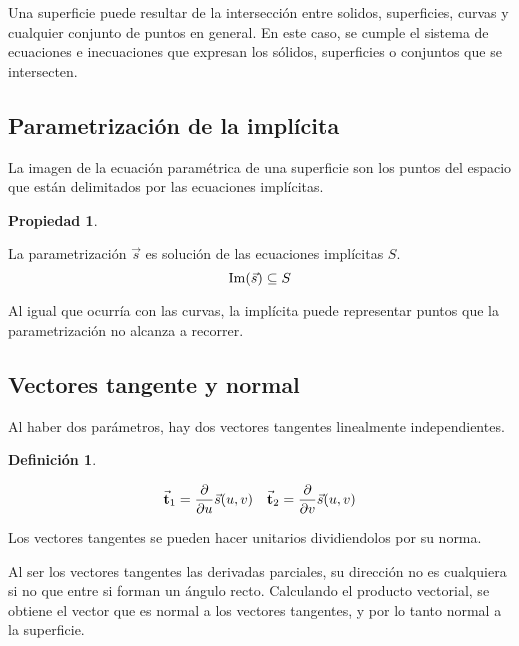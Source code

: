 \documentclass[a5paper,12pt,twoside]{book}
\newtheorem{defn}{{Definición}}[chapter]
\newtheorem{prop}{{Propiedad}}[chapter]
\begin{document}

Una superficie puede resultar de la intersección entre solidos, superficies, curvas y cualquier conjunto de puntos en general. En este caso, se cumple el sistema de ecuaciones e inecuaciones que expresan los sólidos, superficies o conjuntos que se intersecten.


\subsection{Parametrización de la implícita}

La imagen de la ecuación paramétrica de una superficie son los puntos del espacio que están delimitados por las ecuaciones implícitas.

\begin{mdframed}[style=MyFrame1]
    \begin{prop}
    \end{prop}
    La parametrización $\Vec{s}$ es solución de las ecuaciones implícitas $S$.
    \begin{equation*}
        \operatorname{Im} (\Vec{s}) \subseteq S
    \end{equation*}
\end{mdframed}

Al igual que ocurría con las curvas, la implícita puede representar puntos que la parametrización no alcanza a recorrer.


\subsection{Vectores tangente y normal}

Al haber dos parámetros, hay dos vectores tangentes linealmente independientes.

\begin{mdframed}[style=MyFrame1]
    \begin{defn}
    \end{defn}
    \begin{equation*}
        \Vec{\textbf{t}}_1 = \frac{\partial}{\partial u} \Vec{s}(u,v)
        \quad
        \Vec{\textbf{t}}_2 = \frac{\partial}{\partial v} \Vec{s}(u,v)
    \end{equation*}
\end{mdframed}

Los vectores tangentes se pueden hacer unitarios dividiendolos por su norma.

Al ser los vectores tangentes las derivadas parciales, su dirección no es cualquiera si no que entre si forman un ángulo recto. Calculando el producto vectorial, se obtiene el vector que es normal a los vectores tangentes, y por lo tanto normal a la superficie.
\end{document}
